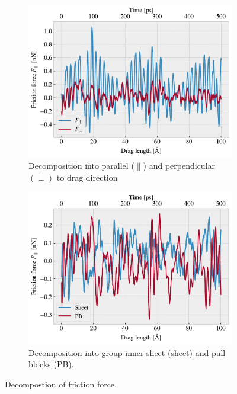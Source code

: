 \begin{figure}[H]
  \centering
  \begin{subfigure}[b]{0.49\textwidth}
      \centering
      \includegraphics[width=\textwidth]{figures/baseline/decomp_direc.pdf}
      \caption{Decomposition into parallel ($\parallel$) and perpendicular $(\perp)$ to drag direction}
      \label{fig:decomp_direc}
  \end{subfigure}
  \hfill
  \begin{subfigure}[b]{0.49\textwidth}
      \centering
      \includegraphics[width=\textwidth]{figures/baseline/decomp_group.pdf}
      \caption{Decomposition into group inner sheet (sheet) and pull blocks (PB).}
      \label{fig:decomp_group}
  \end{subfigure}
  \hfill
     \caption{Decompostion of friction force.}
     \label{fig:decomp}
\end{figure}


